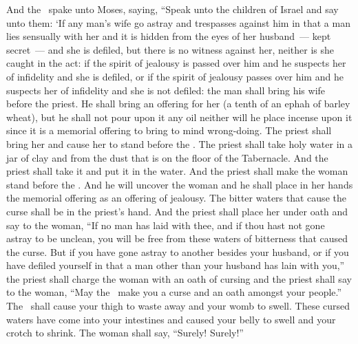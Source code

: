 \begin{inparaenum}
   And the \lord\ spake unto Moses, saying,%
   ``Speak unto the children of Israel and say unto them: `If any man's wife go astray and trespasses against him%
   in that a man lies sensually with her and it is hidden from the eyes of her husband~--- kept secret~--- and she is defiled, but there is no witness against her, neither is she caught in the act:%
   if the spirit of jealousy is passed over him and he suspects her of infidelity and she is defiled, or if the spirit of jealousy passes over him and he suspects her of infidelity and she is not defiled:%
   the man shall bring his wife before the priest. He shall bring an offering for her (a tenth of an ephah of barley wheat), but he shall not pour upon it any oil neither will he place incense upon it since it is a memorial offering to bring to mind wrong-doing.%
   The priest shall bring her and cause her to stand before the \lord.%
   The priest shall take holy water in a jar of clay and from the dust that is on the floor of the Tabernacle. And the priest shall take it and put it in the water.%
   And the priest shall make the woman stand before the \lord. And he will uncover the woman and he shall place in her hands the memorial offering as an offering of jealousy. The bitter waters that cause the curse shall be in the priest's hand.%
   And the priest shall place her under oath and say to the woman, ``If no man has laid with thee, and if thou hast not gone astray to be unclean, you will be free from these waters of bitterness that caused the curse.%
   But if you have gone astray to another besides your husband, or if you have defiled yourself in that a man other than your husband has lain with you,''%
   the priest shall charge the woman with an oath of cursing and the priest shall say to the woman, ``May the \lord\ make you a curse and an oath amongst your people.'' The \lord\ shall cause your thigh to waste away and your womb to swell.%
   These cursed waters have come into your intestines and caused your belly to swell and your crotch to shrink. The woman shall say, ``Surely! Surely!''%

\end{inparaenum}
